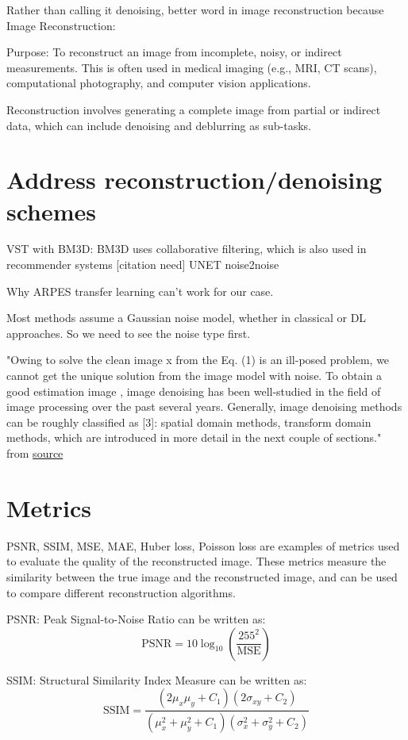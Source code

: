 
Rather than calling it denoising, better word in image reconstruction because
Image Reconstruction:

Purpose: To reconstruct an image from incomplete, noisy, or indirect measurements. This is often used in medical imaging (e.g., MRI, CT scans), computational photography, and computer vision applications. 

Reconstruction involves generating a complete image from partial or indirect data, which can include denoising and deblurring as sub-tasks.

\section{Address reconstruction/denoising schemes}
VST with BM3D: BM3D uses collaborative filtering, which is also used in recommender systems [citation need]
UNET noise2noise

Why ARPES transfer learning can't work for our case.


Most methods assume a Gaussian noise model, whether in classical or DL approaches. So we need to see the noise type first.

"Owing to solve the clean image x from the Eq. (1) is an ill-posed problem, we cannot get the unique solution from the image model with noise. To obtain a good estimation image 
, image denoising has been well-studied in the field of image processing over the past several years. Generally, image denoising methods can be roughly classified as [3]: spatial domain methods, transform domain methods, which are introduced in more detail in the next couple of sections." from \href{https://vciba.springeropen.com/articles/10.1186/s42492-019-0016-7}{source}

\section{Metrics}
PSNR, SSIM, MSE, MAE, Huber loss, Poisson loss are examples of metrics used to evaluate the quality of the reconstructed image. These metrics measure the similarity between the true image and the reconstructed image, and can be used to compare different reconstruction algorithms.

PSNR: Peak Signal-to-Noise Ratio can be written as:
\begin{equation}
    \text{PSNR} = 10 \log_{10} \left( \frac{255^2}{\text{MSE}} \right)
\end{equation}

SSIM: Structural Similarity Index Measure can be written as:
\begin{equation}
    \text{SSIM} = \frac{(2\mu_x\mu_y + C_1)(2\sigma_{xy} + C_2)}{(\mu_x^2 + \mu_y^2 + C_1)(\sigma_x^2 + \sigma_y^2 + C_2)}
\end{equation}

